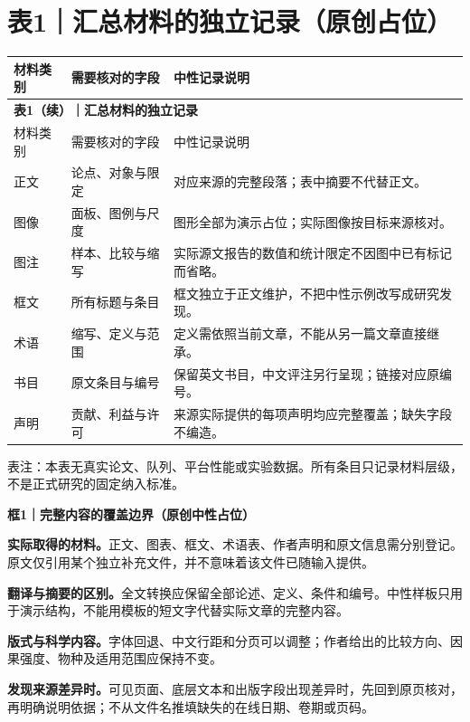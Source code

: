 \documentclass[UTF8,fontset=none,scheme=plain]{ctexart}
\begin{document}
\section*{表1｜汇总材料的独立记录（原创占位）}
{\sffamily\fontsize{8bp}{10.5bp}\selectfont\setlength{\tabcolsep}{5bp}
\begin{longtable}{@{}p{70bp}p{105bp}p{\dimexpr\linewidth-195bp\relax}@{}}
\toprule 材料类别 & 需要核对的字段 & 中性记录说明\\\midrule\endfirsthead
\multicolumn{3}{l}{\bfseries 表1（续）｜汇总材料的独立记录}\\[4bp]
\toprule 材料类别 & 需要核对的字段 & 中性记录说明\\\midrule\endhead
正文 & 论点、对象与限定 & 对应来源的完整段落；表中摘要不代替正文。\\[6bp]
图像 & 面板、图例与尺度 & 图形全部为演示占位；实际图像按目标来源核对。\\[6bp]
图注 & 样本、比较与缩写 & 实际源文报告的数值和统计限定不因图中已有标记而省略。\\[6bp]
框文 & 所有标题与条目 & 框文独立于正文维护，不把中性示例改写成研究发现。\\[6bp]
术语 & 缩写、定义与范围 & 定义需依照当前文章，不能从另一篇文章直接继承。\\[6bp]
书目 & 原文条目与编号 & 保留英文书目，中文评注另行呈现；链接对应原编号。\\[6bp]
声明 & 贡献、利益与许可 & 来源实际提供的每项声明均应完整覆盖；缺失字段不编造。\\[6bp]
\bottomrule\end{longtable}
\noindent 表注：本表无真实论文、队列、平台性能或实验数据。所有条目只记录材料层级，不是正式研究的固定纳入标准。\par}
\vspace{8bp}\noindent\colorbox{NRBox}{\begin{minipage}{\dimexpr\linewidth-2\fboxsep\relax}
\sffamily\fontsize{8.5bp}{11.5bp}\selectfont
\textbf{框1｜完整内容的覆盖边界（原创中性占位）}\par\smallskip
\textbf{实际取得的材料。}正文、图表、框文、术语表、作者声明和原文信息需分别登记。原文仅引用某个独立补充文件，并不意味着该文件已随输入提供。\par\smallskip
\textbf{翻译与摘要的区别。}全文转换应保留全部论述、定义、条件和编号。中性样板只用于演示结构，不能用模板的短文字代替实际文章的完整内容。\par\smallskip
\textbf{版式与科学内容。}字体回退、中文行距和分页可以调整；作者给出的比较方向、因果强度、物种及适用范围应保持不变。\par\smallskip
\textbf{发现来源差异时。}可见页面、底层文本和出版字段出现差异时，先回到原页核对，再明确说明依据；不从文件名推填缺失的在线日期、卷期或页码。\par
\end{minipage}}\par\vspace{8bp}
\end{document}
